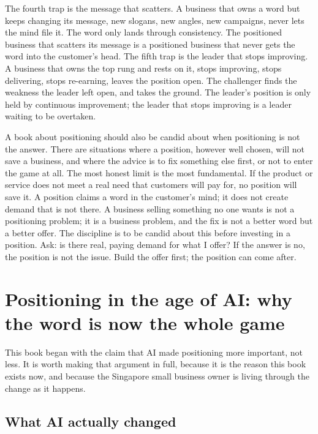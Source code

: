 \documentclass[10pt,twoside,openany]{memoir}
\newcommand{\needspacehead}{\needspace{4\baselineskip}}
\let\oldsection\section
\renewcommand{\section}{\needspacehead\oldsection}
\begin{document}
{The fourth trap is the message that scatters. A business that owns a
word but keeps changing its message, new slogans, new angles, new
campaigns, never lets the mind file it. The word only lands through
consistency. The positioned business that scatters its message is a
positioned business that never gets the word into the customer's head.
The fifth trap is the leader that stops improving. A business that owns
the top rung and rests on it, stops improving, stops delivering, stops
re-earning, leaves the position open. The challenger finds the weakness
the leader left open, and takes the ground. The leader's position is
only held by continuous improvement; the leader that stops improving is
a leader waiting to be overtaken.

A book about positioning should also be candid about when positioning is
not the answer. There are situations where a position, however well
chosen, will not save a business, and where the advice is to fix
something else first, or not to enter the game at all. The most honest
limit is the most fundamental. If the product or service does not meet a
real need that customers will pay for, no position will save it. A
position claims a word in the customer's mind; it does not create demand
that is not there. A business selling something no one wants is not a
positioning problem; it is a business problem, and the fix is not a
better word but a better offer. The discipline is to be candid about
this before investing in a position. Ask: is there real, paying demand
for what I offer? If the answer is no, the position is not the issue.
Build the offer first; the position can come after.

\FloatBarrier
\chapter{Positioning in the age of AI: why the word is now the whole
game}\label{positioning-in-the-age-of-ai-why-the-word-is-now-the-whole-game}

This book began with the claim that AI made positioning more important,
not less. It is worth making that argument in full, because it is the
reason this book exists now, and because the Singapore small business
owner is living through the change as it happens.

\section{What AI actually changed}\label{what-ai-actually-changed}

}
\end{document}
